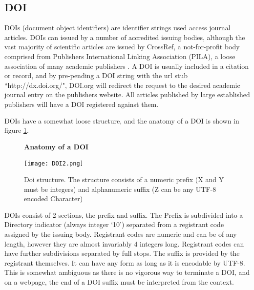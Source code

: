 \documentclass[11pt, oneside]{article}   	%
\begin{document}
\subsection{DOI}
\label{sec:DOI}
DOIs (document object identifiers) are identifier strings used access journal articles. DOIs can issued by a number of accredited issuing bodies, although the vast majority of scientific articles are issued by CrossRef, a not-for-profit body comprised from Publishers International Linking Association (PILA), a loose association of many academic publishers \cite{CROSSREF}. A DOI is usually included in a citation or record, and by pre-pending a DOI string with the url stub ``http://dx.doi.org/", DOI.org will redirect the request to the desired academic journal entry on the publishers website. All articles published by large established publishers will have a DOI registered against them.

DOIs have a somewhat loose structure, and the anatomy of a DOI is shown in figure \ref{fig:DOI}.

\begin{figure}[H]
    \centering
    \textbf{Anatomy of a DOI}\par\medskip
    \texttt{[image: DOI2.png]}
    \caption{Doi structure. The structure consists of a numeric prefix (X and Y must be integers) and alphanumeric suffix (Z can be any UTF-8 encoded Character) \label{fig:DOI}}
\end{figure}
DOIs consist of 2 sections, the prefix and suffix. The Prefix is subdivided into a Directory indicator (always integer `10') separated from a registrant code assigned by the issuing body. Registrant codes are numeric and can be of any length, however they are almost invariably 4 integers long. Registrant codes can have further subdivisions separated by full stops. The suffix is provided by the registrant themselves. It can have any form as long as it is encodable by UTF-8. This is somewhat ambiguous as there is no vigorous way to terminate a DOI, and on a webpage, the end of a DOI suffix must be interpreted from the context.
\end{document}
